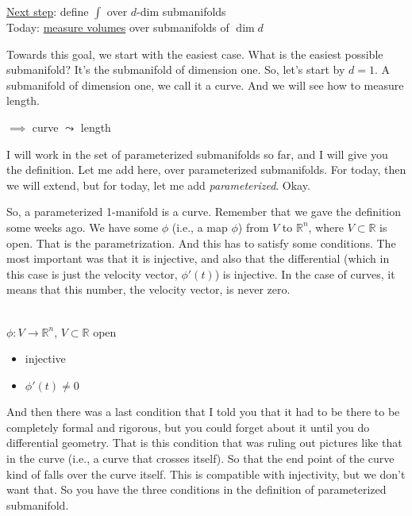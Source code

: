 \begin{math-stroke}
\underline{Next step}: define $\int$ over $d$-dim submanifolds\\[0.5em]
Today: \underline{measure volumes} over submanifolds of $\dim d$
\end{math-stroke}

\begin{spoken-clean}[03:27 - 04:30]
Towards this goal, we start with the easiest case. What is the easiest possible submanifold? It's the submanifold of dimension one. So, let's start by $d=1$. A submanifold of dimension one, we call it a curve. And we will see how to measure length.
\end{spoken-clean}

\begin{math-stroke}[Case: d=1 (Curves)]
 $\implies$ curve $\leadsto$ length
\end{math-stroke}

\begin{spoken-clean}[04:30 - 05:50]
I will work in the set of parameterized submanifolds so far, and I will give you the definition. Let me add here, over parameterized submanifolds. For today, then we will extend, but for today, let me add \emph{parameterized}. Okay.

So, a parameterized 1-manifold is a curve. Remember that we gave the definition some weeks ago. We have some $\phi$ (i.e., a map $\phi$) from $V$ to $\mathbb{R}^n$, where $V \subset \mathbb{R}$ is open. That is the parametrization. And this has to satisfy some conditions. The most important was that it is injective, and also that the differential (which in this case is just the velocity vector, $\phi'(t)$) is injective. In the case of curves, it means that this number, the velocity vector, is never zero.
\end{spoken-clean}

\begin{math-stroke}
 \\[0.5em]
$\phi: V \to \mathbb{R}^n$, $V \subset \mathbb{R}$ open
\begin{itemize}
    \item injective
    \item $\phi'(t) \neq 0$
\end{itemize}
\end{math-stroke}

\begin{spoken-clean}[05:50 - 06:25]
And then there was a last condition that I told you that it had to be there to be completely formal and rigorous, but you could forget about it until you do differential geometry. That is this condition that was ruling out pictures like that in the curve (i.e., a curve that crosses itself). So that the end point of the curve kind of falls over the curve itself. This is compatible with injectivity, but we don't want that. So you have the three conditions in the definition of parameterized submanifold.
\end{spoken-clean}

